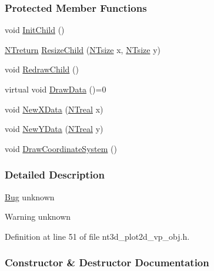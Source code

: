 \subsubsection*{Protected Member Functions}
\begin{DoxyCompactItemize}
\item 
void \hyperlink{class_n_t3_d__plot2d__vp__o_a7d35b4898f38b28b74cebcf0239d6afb}{InitChild} ()
\item 
\hyperlink{nt__types_8h_ab9564ee8f091e809d21b8451c6683c53}{NTreturn} \hyperlink{class_n_t3_d__plot2d__vp__o_a3bfe9a35ef18810ddb905c6df3b22f5f}{ResizeChild} (\hyperlink{nt__types_8h_a06c124f2e4469769b58230253ce0560b}{NTsize} x, \hyperlink{nt__types_8h_a06c124f2e4469769b58230253ce0560b}{NTsize} y)
\item 
void \hyperlink{class_n_t3_d__plot2d__vp__o_abc17b1bb053566289767920b0525cb6f}{RedrawChild} ()
\item 
virtual void \hyperlink{class_n_t3_d__plot2d__vp__o_ae7a9e3390486b8859efcf28a219cf474}{DrawData} ()=0
\item 
void \hyperlink{class_n_t3_d__plot2d__vp__o_a8b7388fab2a1af27615022d5819081a5}{NewXData} (\hyperlink{nt__types_8h_a814a97893e9deb1eedcc7604529ba80d}{NTreal} x)
\item 
void \hyperlink{class_n_t3_d__plot2d__vp__o_ae0b6d58ee874279ee58148ef447874aa}{NewYData} (\hyperlink{nt__types_8h_a814a97893e9deb1eedcc7604529ba80d}{NTreal} y)
\item 
void \hyperlink{class_n_t3_d__plot2d__vp__o_a833f389def195827d779df51bd883125}{DrawCoordinateSystem} ()
\end{DoxyCompactItemize}


\subsubsection{Detailed Description}
\begin{Desc}
\item[\hyperlink{bug__bug000029}{Bug}]unknown \end{Desc}
\begin{DoxyWarning}{Warning}
unknown 
\end{DoxyWarning}


Definition at line 51 of file nt3d\_\-plot2d\_\-vp\_\-obj.h.



\subsubsection{Constructor \& Destructor Documentation}
